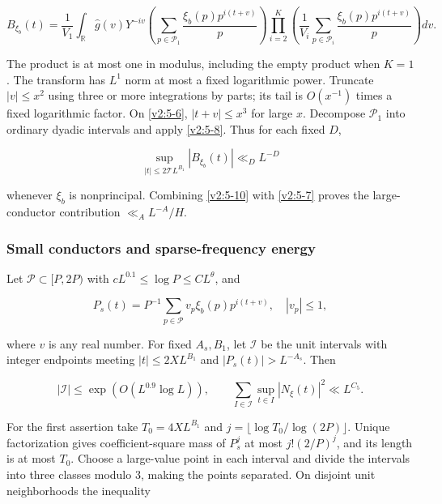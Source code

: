 \documentclass[11pt]{article}
\theoremstyle{definition}
\theoremstyle{remark}
\numberwithin{equation}{section}
\begin{document}
\begin{equation}\label{v2:5-9}
B_{\xi_b}(t)=\frac1{V_1}\int_{\mathbb R}\widehat g(v)Y^{-iv}
 \left(\sum_{p\in\mathcal P_1}\frac{\xi_b(p)p^{i(t+v)}}p\right)
 \prod_{i=2}^K\left(\frac1{V_i}\sum_{p\in\mathcal P_i}\frac{\xi_b(p)p^{i(t+v)}}p\right)dv.
\end{equation}


The product is at most one in modulus, including the empty product when $K=1$. The transform has $L^1$ norm at most a fixed logarithmic power. Truncate $|v|\le x^2$ using three or more integrations by parts; its tail is $O(x^{-1})$ times a fixed logarithmic factor. On \eqref{v2:5-6}, $|t+v|\le x^3$ for large $x$. Decompose $\mathcal P_1$ into ordinary dyadic intervals and apply \eqref{v2:5-8}. Thus for each fixed $D$,


\begin{equation}\label{v2:5-10}
\sup_{|t|\le2\mathcal T L^{B_1}}|B_{\xi_b}(t)|\ll_D L^{-D}
\end{equation}


whenever $\xi_b$ is nonprincipal. Combining \eqref{v2:5-10} with \eqref{v2:5-7} proves the large-conductor contribution $\ll_A L^{-A}/H$.

\subsubsection{Small conductors and sparse-frequency energy}\label{subsec:sparse}
Let $\mathcal P\subset[P,2P)$ with $cL^{0.1}\le\log P\le CL^\theta$, and


\begin{equation}
P_s(t)=P^{-1}\sum_{p\in\mathcal P}v_p\xi_b(p)p^{i(t+v)},\quad |v_p|\le1,
\end{equation}


where $v$ is any real number. For fixed $A_s,B_1$, let $\mathcal I$ be the unit intervals with integer endpoints meeting $|t|\le2XL^{B_1}$ and $|P_s(t)|>L^{-A_s}$. Then


\begin{equation}\label{v2:5-12}
|\mathcal I|\le\exp(O(L^{0.9}\log L)),\qquad
\sum_{I\in\mathcal I}\sup_{t\in I}|N_\xi(t)|^2\ll L^{C_5}.
\end{equation}


For the first assertion take $T_0=4XL^{B_1}$ and $j=\lfloor\log T_0/\log(2P)\rfloor$. Unique factorization gives coefficient-square mass of $P_s^j$ at most $j!(2/P)^j$, and its length is at most $T_0$. Choose a large-value point in each interval and divide the intervals into three classes modulo 3, making the points separated. On disjoint unit neighborhoods the inequality
\end{document}
